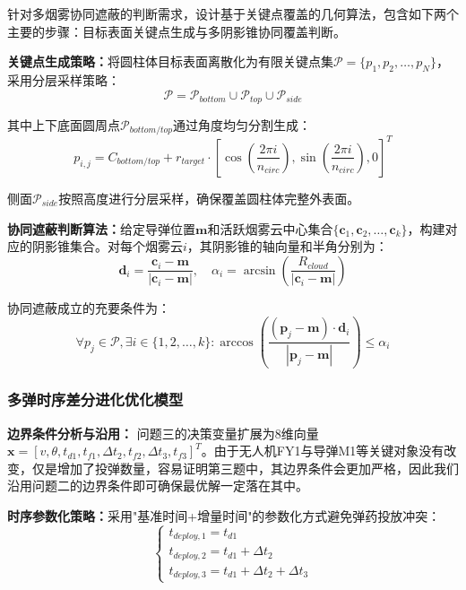 \documentclass[fontset=SimSun]{ctexart}
\begin{document}
针对多烟雾协同遮蔽的判断需求，设计基于关键点覆盖的几何算法，包含如下两个主要的步骤：目标表面关键点生成与多阴影锥协同覆盖判断。

\textbf{关键点生成策略：}将圆柱体目标表面离散化为有限关键点集$\mathcal{P} = \{p_1, p_2, \ldots, p_N\}$，采用分层采样策略：
\begin{equation}
\mathcal{P} = \mathcal{P}_{bottom} \cup \mathcal{P}_{top} \cup \mathcal{P}_{side}
\end{equation}

其中上下底面圆周点$\mathcal{P}_{bottom/top}$通过角度均匀分割生成：
\begin{equation}
p_{i,j} = C_{bottom/top} + r_{target} \cdot [\cos(\frac{2\pi i}{n_{circ}}), \sin(\frac{2\pi i}{n_{circ}}), 0]^T
\end{equation}

侧面$\mathcal{P}_{side}$按照高度进行分层采样，确保覆盖圆柱体完整外表面。

\textbf{协同遮蔽判断算法：}给定导弹位置$\mathbf{m}$和活跃烟雾云中心集合$\{\mathbf{c}_1, \mathbf{c}_2, \ldots, \mathbf{c}_k\}$，构建对应的阴影锥集合。对每个烟雾云$i$，其阴影锥的轴向量和半角分别为：
\begin{equation}
\mathbf{d}_i = \frac{\mathbf{c}_i - \mathbf{m}}{|\mathbf{c}_i - \mathbf{m}|}, \quad \alpha_i = \arcsin\left(\frac{R_{cloud}}{|\mathbf{c}_i - \mathbf{m}|}\right)
\end{equation}

协同遮蔽成立的充要条件为：
\begin{equation}
\forall p_j \in \mathcal{P}, \exists i \in \{1,2,\ldots,k\}: \arccos\left(\frac{(\mathbf{p}_j - \mathbf{m}) \cdot \mathbf{d}_i}{|\mathbf{p}_j - \mathbf{m}|}\right) \leq \alpha_i
\end{equation}

\subsubsection{多弹时序差分进化优化模型}

\textbf{边界条件分析与沿用：}
问题三的决策变量扩展为8维向量$\mathbf{x} = [v, \theta, t_{d1}, t_{f1}, \Delta t_2, t_{f2}, \Delta t_3, t_{f3}]^T$。由于无人机FY1与导弹M1等关键对象没有改变，仅是增加了投弹数量，容易证明第三题中，其边界条件会更加严格，因此我们沿用问题二的边界条件即可确保最优解一定落在其中。

\textbf{时序参数化策略：}采用"基准时间+增量时间"的参数化方式避免弹药投放冲突：
\begin{equation}
\begin{cases}
t_{deploy,1} = t_{d1} \\
t_{deploy,2} = t_{d1} + \Delta t_2 \\
t_{deploy,3} = t_{d1} + \Delta t_2 + \Delta t_3
\end{cases}
\end{equation}
\end{document}
